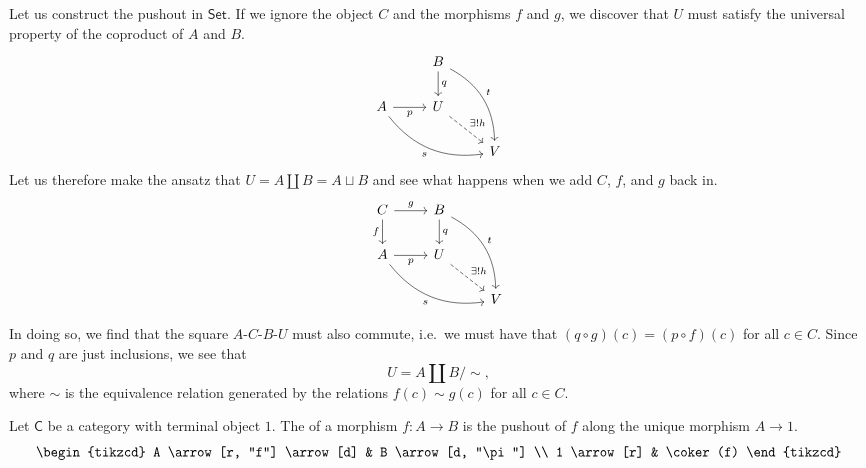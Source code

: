 \documentclass[main.tex]{subfiles}
\begin{document}
\begin{example}
  Let us construct the pushout in $\mathsf{Set}$. If we ignore the object $C$ and the morphisms $f$ and $g$, we discover that $U$ must satisfy the universal property of the coproduct of $A$ and $B$.
  \begin{equation*}
    \begin{tikzcd}
      & B \arrow[d, "q"] \arrow[ddr, bend left, "t"] & \\
      A \arrow[drr, bend right, swap, "s"] \arrow[r, swap, "p"] & U \arrow[dr, dashed, "\exists!h"] & \\
      & & V
    \end{tikzcd}
  \end{equation*}
  Let us therefore make the ansatz that $U = A \amalg B = A \sqcup B$ and see what happens when we add $C$, $f$, and $g$ back in.
  \begin{equation*}
    \begin{tikzcd}
      C \arrow[r, "g"] \arrow[d, swap, "f"] & B \arrow[d, "q"] \arrow[ddr, bend left, "t"] & \\
      A \arrow[drr, bend right, swap, "s"] \arrow[r, swap, "p"] & U \arrow[dr, dashed, "\exists!h"] & \\
      & & V
    \end{tikzcd}
  \end{equation*}

  In doing so, we find that the square $A$-$C$-$B$-$U$ must also commute, i.e.\ we must have that $(q \circ g) (c) = (p \circ f)(c)$ for all $c \in C$. Since $p$ and $q$ are just inclusions, we see that
  \begin{equation*}
    U = A \amalg B / \sim,
  \end{equation*}
  where $\sim$ is the equivalence relation generated by the relations $f(c) \sim g(c)$ for all $c\in C$.
\end{example}

\begin{definition}
  \label{def:cokernalofmorphism}
  Let $\mathsf{C}$ be a category with terminal object $1$. The  of a morphism $f\colon A \to B$ is the pushout of $f$ along the unique morphism $A \to 1$.
  \begin{equation*}
    \begin{tikzcd}
      A \arrow[r, "f"] \arrow[d] & B \arrow[d, "\pi"] \\
      1 \arrow[r] & \coker(f)
    \end{tikzcd}
  \end{equation*}
\end{definition}
\end{document}
